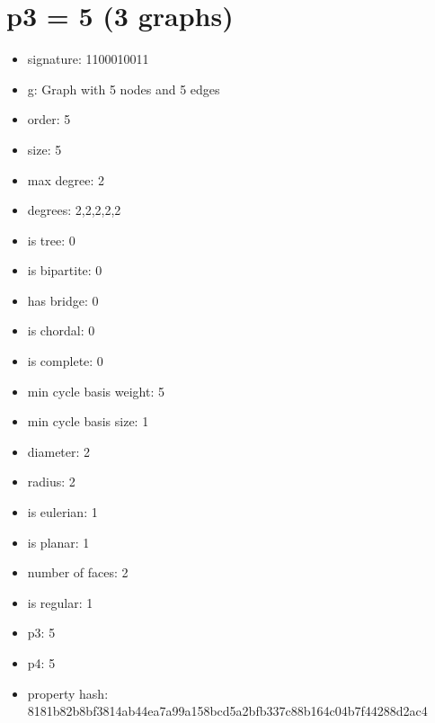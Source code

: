 \chapter{p3 = 5 (3 graphs)}
\newpage\begin{figure}
\end{figure}
\begin{itemize}
\item signature: 1100010011
\item g: Graph with 5 nodes and 5 edges
\item order: 5
\item size: 5
\item max degree: 2
\item degrees: 2,2,2,2,2
\item is tree: 0
\item is bipartite: 0
\item has bridge: 0
\item is chordal: 0
\item is complete: 0
\item min cycle basis weight: 5
\item min cycle basis size: 1
\item diameter: 2
\item radius: 2
\item is eulerian: 1
\item is planar: 1
\item number of faces: 2
\item is regular: 1
\item p3: 5
\item p4: 5
\item property hash: 8181b82b8bf3814ab44ea7a99a158bcd5a2bfb337c88b164c04b7f44288d2ac4
\end{itemize}
\newpage
\begin{figure}
\end{figure}
